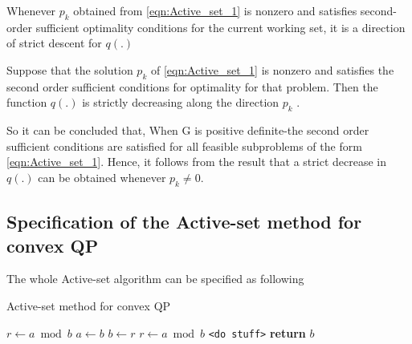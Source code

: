 Whenever $p_k$ obtained from \ref{eqn:Active_set_1} is nonzero and satisfies second-order sufficient optimality conditions for the current working set, it is a direction of strict descent for $q(.)$

\begin{theorem}
	Suppose that the solution $p_k$ of \ref{eqn:Active_set_1} is nonzero and satisfies the second order sufficient conditions for optimality for that problem. Then the function $q(.)$ is strictly decreasing along the direction $p_k$ .
\end{theorem}


So it can be concluded that, When G is positive definite-the second order sufficient conditions are satisfied for all feasible subproblems of the form \ref{eqn:Active_set_1}. Hence, it follows from the result that a strict decrease in $q(.)$ can be obtained whenever $p_k \neq 0$.

\subsection*{Specification of the Active-set method for convex QP}

The whole Active-set algorithm can be specified as following

\begin{algorithm}
  \caption{Active-set method for convex QP}\label{euclid}
  \begin{algorithmic}[1]
      \State $r\gets a\bmod b$
        \State $a\gets b$
        \State $b\gets r$
        \State $r\gets a\bmod b$
      \EndWhile\label{euclidendwhile}
        \State \texttt{<do stuff>}
      \EndFor
      \State \textbf{return} $b$
    \EndProcedure
  \end{algorithmic}
\end{algorithm}




































